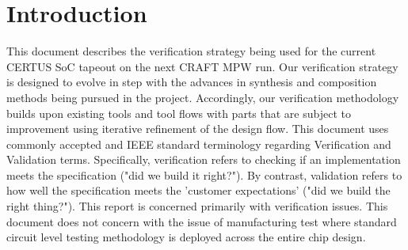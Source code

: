 
\section{Introduction}

This document describes the verification strategy being used for the
current CERTUS SoC tapeout on the next CRAFT MPW run.  Our verification strategy is designed to evolve in step with the advances in synthesis and composition methods being pursued in the project. Accordingly, our verification methodology builds upon existing tools and tool flows with parts that are subject to improvement using iterative refinement of the design flow. This document uses commonly accepted and IEEE standard terminology regarding Verification and Validation terms. Specifically, verification refers to checking if an implementation meets the specification ("did we build it right?"). By contrast, validation refers to how well the specification meets the 'customer expectations' ("did we build the right thing?"). This report is concerned primarily with verification issues. 
This document does not concern with the issue of manufacturing test where standard circuit level testing methodology is deployed across the entire chip design.






